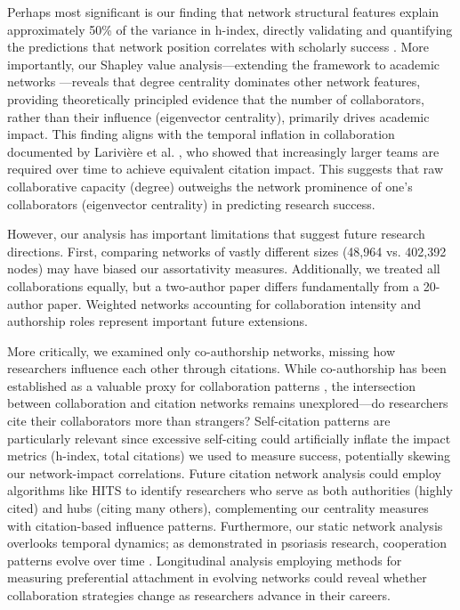 \documentclass[9pt,twocolumn,twoside]{pnas-new}
\begin{document}
\noindent Perhaps most significant is our finding that network structural features explain approximately 50\% of the variance in h-index, directly validating and quantifying the predictions that network position correlates with scholarly success \cite{abbasi2011identifying,yan2012scholarly}. More importantly, our Shapley value analysis—extending the framework to academic networks \cite{rozemberczki2022shapley}—reveals that degree centrality dominates other network features, providing theoretically principled evidence that the number of collaborators, rather than their influence (eigenvector centrality), primarily drives academic impact. This finding aligns with the temporal inflation in collaboration documented by Larivière et al. \cite{lariviere2015team}, who showed that increasingly larger teams are required over time to achieve equivalent citation impact. This suggests that raw collaborative capacity (degree) outweighs the network prominence of one's collaborators (eigenvector centrality) in predicting research success.
\newline

\noindent However, our analysis has important limitations that suggest future research directions. First, comparing networks of vastly different sizes (48,964 vs. 402,392 nodes) may have biased our assortativity measures. Additionally, we treated all collaborations equally, but a two-author paper differs fundamentally from a 20-author paper. Weighted networks accounting for collaboration intensity and authorship roles represent important future extensions.
 \newline
 
\noindent More critically, we examined only co-authorship networks, missing how researchers influence each other through citations. While co-authorship has been established as a valuable proxy for collaboration patterns \cite{newman2004coauthorship}, the intersection between collaboration and citation networks remains unexplored—do researchers cite their collaborators more than strangers? Self-citation patterns are particularly relevant since excessive self-citing could artificially inflate the impact metrics (h-index, total citations) we used to measure success, potentially skewing our network-impact correlations. Future citation network analysis could employ algorithms like HITS to identify researchers who serve as both authorities (highly cited) and hubs (citing many others), complementing our centrality measures with citation-based influence patterns. Furthermore, our static network analysis overlooks temporal dynamics; as demonstrated in psoriasis research, cooperation patterns evolve over time \cite{gonzalez2015evolution}. Longitudinal analysis employing methods for measuring preferential attachment in evolving networks \cite{jeong2003measuring} could reveal whether collaboration strategies change as researchers advance in their careers.
\end{document}
